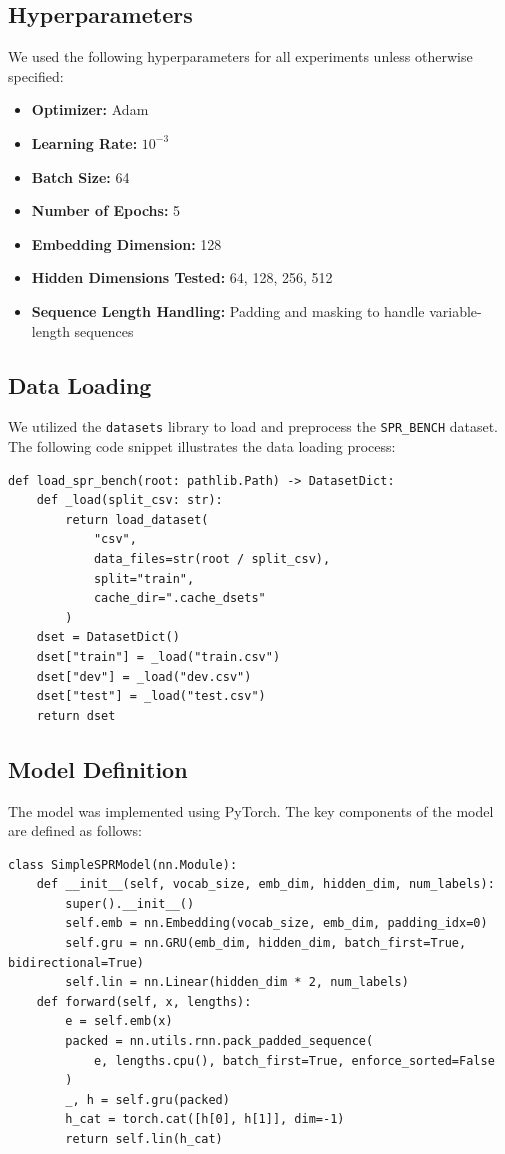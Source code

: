 \documentclass{article} %
\theoremstyle{plain}
\begin{document}
\subsection{Hyperparameters}

We used the following hyperparameters for all experiments unless otherwise specified:

\begin{itemize}
    \item \textbf{Optimizer:} Adam~\citep{goodfellow2016deep}
    \item \textbf{Learning Rate:} $10^{-3}$
    \item \textbf{Batch Size:} 64
    \item \textbf{Number of Epochs:} 5
    \item \textbf{Embedding Dimension:} 128
    \item \textbf{Hidden Dimensions Tested:} 64, 128, 256, 512
    \item \textbf{Sequence Length Handling:} Padding and masking to handle variable-length sequences
\end{itemize}

\subsection{Data Loading}

We utilized the \texttt{datasets} library to load and preprocess the \texttt{SPR\_BENCH} dataset. The following code snippet illustrates the data loading process:

\begin{verbatim}
def load_spr_bench(root: pathlib.Path) -> DatasetDict:
    def _load(split_csv: str):
        return load_dataset(
            "csv",
            data_files=str(root / split_csv),
            split="train",
            cache_dir=".cache_dsets"
        )
    dset = DatasetDict()
    dset["train"] = _load("train.csv")
    dset["dev"] = _load("dev.csv")
    dset["test"] = _load("test.csv")
    return dset
\end{verbatim}

\subsection{Model Definition}

The model was implemented using PyTorch. The key components of the model are defined as follows:

\begin{verbatim}
class SimpleSPRModel(nn.Module):
    def __init__(self, vocab_size, emb_dim, hidden_dim, num_labels):
        super().__init__()
        self.emb = nn.Embedding(vocab_size, emb_dim, padding_idx=0)
        self.gru = nn.GRU(emb_dim, hidden_dim, batch_first=True, bidirectional=True)
        self.lin = nn.Linear(hidden_dim * 2, num_labels)
    def forward(self, x, lengths):
        e = self.emb(x)
        packed = nn.utils.rnn.pack_padded_sequence(
            e, lengths.cpu(), batch_first=True, enforce_sorted=False
        )
        _, h = self.gru(packed)
        h_cat = torch.cat([h[0], h[1]], dim=-1)
        return self.lin(h_cat)
\end{verbatim}
\end{document}

